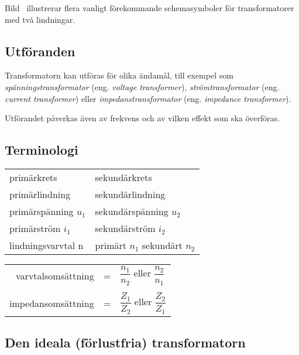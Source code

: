 Bild~ illustrerar flera vanligt förekommande schemasymboler
för transformatorer med två lindningar.

\subsection{Utföranden}

Transformatorn kan utföras för olika ändamål, till exempel som
\emph{spänningstransformator} (eng. \emph{voltage transformer}),
\emph{strömtransformator} (eng. \emph{current transformer}) eller
\emph{impedanstransformator} (eng. \emph{impedance transformer}).

Utförandet påverkas även av frekvens och av vilken effekt som ska överföras.

\subsection{Terminologi}

\begin{center}
\begin{tabular}{ll}
primärkrets & sekundärkrets \\
primärlindning & sekundärlindning \\
primärspänning \(u_1\) &  sekundärspänning \(u_2\) \\
primärström \(i_1\) & sekundärström \(i_2\) \\
lindningsvarvtal n & primärt \(n_1\) sekundärt \(n_2\)
\end{tabular}
\end{center}

\begin{tabular}{rcl}
varvtalsomsättning &=& \(\dfrac{n_1}{n_2}\) eller \(\dfrac{n_2}{n_1}\) \\
&&\\
impedansomsättning &=& \(\dfrac{Z_1}{Z_2}\) eller \(\dfrac{Z_2}{Z_1}\) \\
\end{tabular}

\newpage
\subsection{Den ideala (förlustfria) transformatorn}
\label{ideal_transformator}

